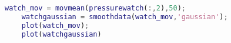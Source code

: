 \begin{lstlisting}[language=Matlab,  basicstyle=\footnotesize]
	watch_mov = movmean(pressurewatch(:,2),50);
	watchgaussian = smoothdata(watch_mov,'gaussian');
	plot(watch_mov);
	plot(watchgaussian)
\end{lstlisting}